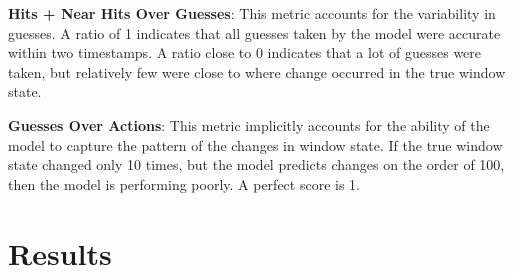 \documentclass[sigconf]{acmart}
\begin{document}
\textbf{Hits + Near Hits Over Guesses}: This metric accounts for the
variability in guesses. A ratio of 1 indicates that all guesses taken by
the model were accurate within two timestamps. A ratio close to 0
indicates that a lot of guesses were taken, but relatively few were
close to where change occurred in the true window state.

\textbf{Guesses Over Actions}: This metric implicitly accounts for the
ability of the model to capture the pattern of the changes in window
state. If the true window state changed only 10 times, but the model
predicts changes on the order of 100, then the model is performing
poorly. A perfect score is 1.

\hypertarget{results}{%
\section{Results}\label{results}}
\end{document}
